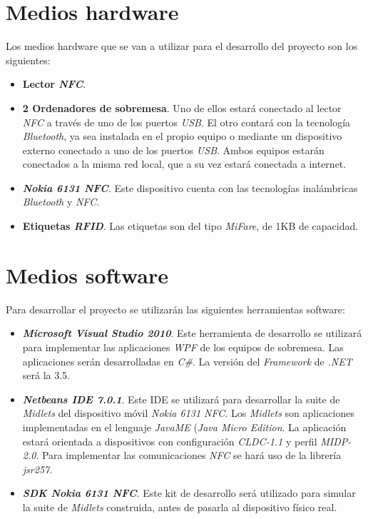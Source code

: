 \section{Medios hardware}
Los medios hardware que se van a utilizar para el desarrollo del proyecto son
los siguientes:
\begin{itemize}
\item \textbf{Lector \emph{NFC}}.
\item \textbf{2 Ordenadores de sobremesa}. Uno de ellos estará conectado al
  lector \emph{NFC} a través de uno de los puertos \emph{USB}. El otro
  contará con la tecnología \emph{Bluetooth}, ya sea instalada en el propio
  equipo o mediante un dispositivo externo conectado a uno de los puertos
  \emph{USB}. Ambos equipos estarán conectados a la misma red local, que a su
  vez estará conectada a internet.
\item \textbf{\emph{Nokia 6131 NFC}}. Este dispositivo cuenta con las
  tecnologías inalámbricas \emph{Bluetooth} y \emph{NFC}.
\item \textbf{Etiquetas \emph{RFID}}. Las etiquetas son del tipo \emph{MiFare},
  de 1KB de capacidad.
\end{itemize}

\section{Medios software}
Para desarrollar el proyecto se utilizarán las siguientes herramientas
software:
\begin{itemize}
\item \textbf{\emph{Microsoft Visual Studio 2010}}. Este herramienta de
  desarrollo se utilizará para implementar las aplicaciones \emph{WPF} de los
  equipos de sobremesa. Las aplicaciones serán desarrolladas en \emph{C\#}. La 
  versión del \emph{Framework} de \emph{.NET} será la 3.5.
\item \textbf{\emph{Netbeans IDE 7.0.1}}. Este IDE se utilizará para
  desarrollar la suite de \emph{Midlets} del dispositivo móvil
  \emph{Nokia 6131 NFC}. Los \emph{Midlets} son aplicaciones implementadas
  en el lenguaje \emph{JavaME} (\emph{Java Micro Edition}. La aplicación estará
  orientada a dispositivos con configuración \emph{CLDC-1.1} y perfil
  \emph{MIDP-2.0}. Para implementar las comunicaciones \emph{NFC} se hará uso de
  la librería \emph{jsr257}.
\item \textbf{\emph{SDK Nokia 6131 NFC}}. Este kit de desarrollo será utilizado
  para simular la suite de \emph{Midlets} construida, antes de pasarla al
  dispositivo físico real.
\end{itemize}


